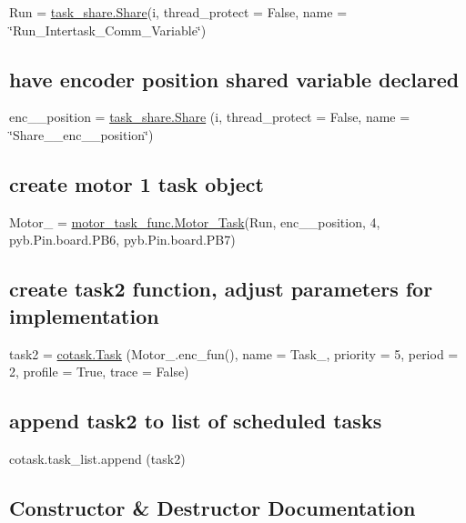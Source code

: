 Run = \hyperlink{classtask__share_1_1Share}{task\+\_\+share.\+Share}(\textquotesingle{}i\textquotesingle{}, thread\+\_\+protect = False, name = \char`\"{}\+Run\+\_\+\+Intertask\+\_\+\+Comm\+\_\+\+Variable\char`\"{}) \subsection*{have encoder position shared variable declared}

enc\+\_\+\_\+position = \hyperlink{classtask__share_1_1Share}{task\+\_\+share.\+Share} (\textquotesingle{}i\textquotesingle{}, thread\+\_\+protect = False, name = \char`\"{}\+Share\+\_\+\_\+enc\+\_\+\_\+position\char`\"{}) \subsection*{create motor 1 task object}

Motor\+\_ = \hyperlink{classmotor__task__func_1_1Motor__Task}{motor\+\_\+task\+\_\+func.\+Motor\+\_\+\+Task}(Run, enc\+\_\+\_\+position, 4, pyb.\+Pin.\+board.\+P\+B6, pyb.\+Pin.\+board.\+P\+B7) \subsection*{create task2 function, adjust parameters for implementation}

task2 = \hyperlink{classcotask_1_1Task}{cotask.\+Task} (Motor\+\_.\+enc\+\_\+fun(), name = \textquotesingle{}Task\+\_\textquotesingle{}, priority = 5, period = 2, profile = True, trace = False) \subsection*{append task2 to list of scheduled tasks}

cotask.\+task\+\_\+list.\+append (task2) 

\subsection{Constructor \& Destructor Documentation}
